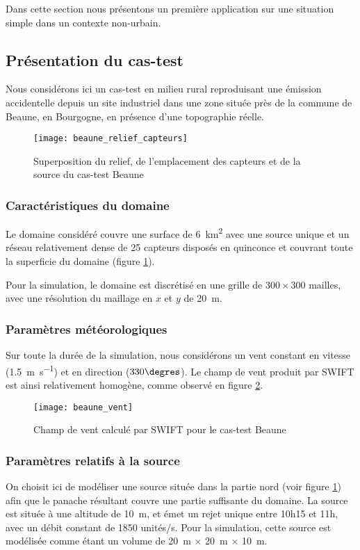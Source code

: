 Dans cette section nous présentons un première application sur une situation  simple dans un contexte non-urbain.

\subsection{Présentation du cas-test}

Nous considérons ici un cas-test en milieu rural reproduisant une émission accidentelle depuis un site industriel dans une zone située près de la commune de Beaune, en Bourgogne, en présence d'une topographie réelle. 

\begin{figure}[h!]
	\centering
	\texttt{[image: beaune\_relief\_capteurs]}
	\caption{Superposition du relief, de l'emplacement des capteurs et de la source du cas-test Beaune}
	\label{fig_beaune_relief}
\end{figure}

\subsubsection{Caractéristiques du domaine}
Le domaine considéré couvre une surface de \SI{6}{\square\kilo\meter} avec une source unique et un réseau relativement dense de 25 capteurs disposés en quinconce et couvrant toute la superficie du domaine (figure \ref{fig_beaune_relief}).

Pour la simulation, le domaine est discrétisé en une grille de $300 \times 300$ mailles, avec une résolution du maillage en $x$ et $y$ de \SI{20}{\meter}.

\subsubsection{Paramètres météorologiques}
Sur toute la durée de la simulation, nous considérons un vent constant en vitesse (\SI{1.5}{\m\per\second}) et en direction ($330\degres$). Le champ de vent produit par SWIFT est ainsi relativement homogène, comme observé en figure \ref{fig_beaune_vent}.

\begin{figure}[h!]
	\centering
	\texttt{[image: beaune\_vent]}
	\caption{Champ de vent calculé par SWIFT pour le cas-test Beaune}
	\label{fig_beaune_vent}
\end{figure}


\subsubsection{Paramètres relatifs à la source}
On choisit ici de modéliser une source située dans la partie nord (voir figure \ref{fig_beaune_relief}) afin que le panache résultant couvre une partie suffisante du domaine. La source est située à une altitude de \SI{10}{\m}, et émet un rejet unique entre 10h15 et 11h, avec un débit constant de 1850 unités/s. Pour la simulation, cette source est modélisée comme étant un volume de \SI{20}{\m} $\times$ \SI{20}{\m} $\times$ \SI{10}{\m}. 

